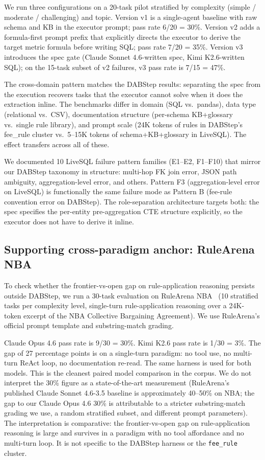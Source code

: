 \documentclass[conference]{IEEEtran}
\newcommand{\Kimi}{Kimi K2.6}
\newcommand{\Opus}{Claude Opus 4.6}
\newcommand{\Sonnet}{Claude Sonnet 4.6}
\begin{document}
We run three configurations on a 20-task pilot stratified by complexity (simple / moderate / challenging) and topic. Version v1 is a single-agent baseline with raw schema and KB in the executor prompt; pass rate 6/20 = 30\%. Version v2 adds a formula-first prompt prefix that explicitly directs the executor to derive the target metric formula before writing SQL; pass rate 7/20 = 35\%. Version v3 introduces the spec gate (\Sonnet{}-written spec, \Kimi{}-written SQL); on the 15-task subset of v2 failures, v3 pass rate is 7/15 = 47\%.

The cross-domain pattern matches the DABStep results: separating the spec from the execution recovers tasks that the executor cannot solve when it does the extraction inline. The benchmarks differ in domain (SQL vs.\ pandas), data type (relational vs.\ CSV), documentation structure (per-schema KB+glossary vs.\ single rule library), and prompt scale (24K tokens of rules in DABStep's fee_rule cluster vs.\ 5--15K tokens of schema+KB+glossary in LiveSQL). The effect transfers across all of these.

We documented 10 LiveSQL failure pattern families (E1--E2, F1--F10) that mirror our DABStep taxonomy in structure: multi-hop FK join error, JSON path ambiguity, aggregation-level error, and others. Pattern F3 (aggregation-level error on LiveSQL) is functionally the same failure mode as Pattern B (fee-rule convention error on DABStep). The role-separation architecture targets both: the spec specifies the per-entity pre-aggregation CTE structure explicitly, so the executor does not have to derive it inline.

\subsection{Supporting cross-paradigm anchor: RuleArena NBA}
\label{sec:rulearena}

To check whether the frontier-vs-open gap on rule-application reasoning persists outside DABStep, we run a 30-task evaluation on RuleArena NBA~\cite{rulearena2025} (10 stratified tasks per complexity level, single-turn rule-application reasoning over a 24K-token excerpt of the NBA Collective Bargaining Agreement). We use RuleArena's official prompt template and substring-match grading.

\Opus{} pass rate is 9/30 = 30\%. \Kimi{} pass rate is 1/30 = 3\%. The gap of 27 percentage points is on a single-turn paradigm: no tool use, no multi-turn ReAct loop, no documentation re-read. The same harness is used for both models. This is the cleanest paired model comparison in the corpus. We do not interpret the 30\% figure as a state-of-the-art measurement (RuleArena's published \Sonnet{}-3.5 baseline is approximately 40--50\% on NBA; the gap to our \Opus{} 30\% is attributable to a stricter substring-match grading we use, a random stratified subset, and different prompt parameters). The interpretation is comparative: the frontier-vs-open gap on rule-application reasoning is large and survives in a paradigm with no tool affordance and no multi-turn loop. It is not specific to the DABStep harness or the \texttt{fee\_rule} cluster.
\end{document}
